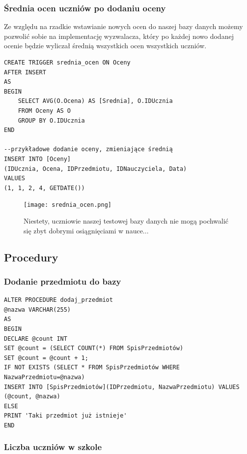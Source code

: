 \documentclass[60pt]{article}
\begin{document}
\subsubsection{Średnia ocen uczniów po dodaniu oceny}

Ze względu na rzadkie wstawianie nowych ocen do naszej bazy danych możemy pozwolić sobie na implementację wyzwalacza, który po każdej nowo dodanej ocenie będzie wyliczał średnią wszystkich ocen wszystkich uczniów.

\begin{verbatim}
CREATE TRIGGER srednia_ocen ON Oceny
AFTER INSERT
AS
BEGIN
    SELECT AVG(O.Ocena) AS [Srednia], O.IDUcznia 
    FROM Oceny AS O
    GROUP BY O.IDUcznia
END

--przykładowe dodanie oceny, zmieniające średnią
INSERT INTO [Oceny]
(IDUcznia, Ocena, IDPrzedmiotu, IDNauczyciela, Data)
VALUES
(1, 1, 2, 4, GETDATE())
\end{verbatim}

\begin{figure}[h]
\begin{center}
  \texttt{[image: srednia\_ocen.png]}
  \caption{Niestety, uczniowie naszej testowej bazy danych nie mogą pochwalić się zbyt dobrymi osiągnięciami w nauce...}
  \label{Niestety, uczniowie naszej testowej bazy danych nie mogą pochwalić się zbyt dobrymi osiągnięciami w nauce...}
  \end{center}
\end{figure}

\subsection{Procedury}

\subsubsection{Dodanie przedmiotu do bazy}

\begin{verbatim}
ALTER PROCEDURE dodaj_przedmiot
@nazwa VARCHAR(255)
AS
BEGIN
DECLARE @count INT
SET @count = (SELECT COUNT(*) FROM SpisPrzedmiotów)
SET @count = @count + 1;
IF NOT EXISTS (SELECT * FROM SpisPrzedmiotów WHERE NazwaPrzedmiotu=@nazwa)
INSERT INTO [SpisPrzedmiotów](IDPrzedmiotu, NazwaPrzedmiotu) VALUES (@count, @nazwa)
ELSE 
PRINT 'Taki przedmiot już istnieje'
END
\end{verbatim}

\subsubsection{Liczba uczniów w szkole}
\end{document}
